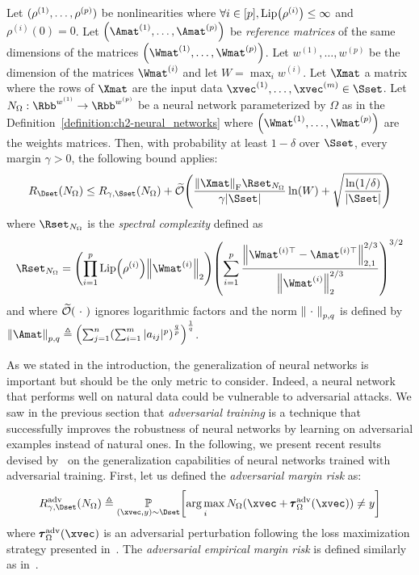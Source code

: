 \begin{theorem}
  Let $(\rho^{(1)}, \dots, \rho^{(p)})$ be nonlinearities where $\forall i \in [\depth], \lip{\rho^{(i)}} \leq \infty$ and $\rho^{(i)}(0) = 0$.
  Let $\left( \Amat^{(1)}, \dots, \Amat^{(\depth)} \right)$ be \emph{reference matrices} of the same dimensions of the matrices $\left( \Wmat^{(1)}, \dots, \Wmat^{(\depth)} \right)$.
  Let $w^{(1)}, \dots, w^{(p)}$ be the dimension of the matrices $\Wmat^{(i)}$ and let $W = \max_i w^{(i)}$.
  Let $\Xmat$ a matrix where the rows of $\Xmat$ are the input data $\xvec^{(1)}, \dots, \xvec^{(m)} \in \Sset$.
  Let $N_\Omega: \Rbb^{w^{(1)}} \rightarrow \Rbb^{w^{(\depth)}}$ be a neural network parameterized by $\Omega$ as in the Definition~\ref{definition:ch2-neural_networks} where $\left( \Wmat^{(1)}, \dots, \Wmat^{(\depth)} \right)$ are the weights matrices.
  Then, with probability at least $1 - \delta$ over $\Sset$, every margin $\gamma > 0$, the following bound applies:
  \begin{equation}
    R_\Dset(N_\Omega) \leq R_{\gamma,\Sset} (N_\Omega) + \widetilde{\bigO}\left( \frac{\norm{\Xmat}_\fro \Rset_{N_\Omega}}{\gamma |\Sset|} \ln(W) + \sqrt{\frac{\ln(1/\delta)}{|\Sset|}} \right)
  \end{equation}
  where $\Rset_{N_\Omega}$ is the \emph{spectral complexity} defined as 
  \begin{equation}
    \Rset_{N_\Omega} = \left(\prod_{i = 1}^{\depth} \lip{\rho^{(i)}} \norm{\Wmat^{(i)}}_2 \right) \left( \sum_{i=1}^{\depth} \frac{\norm{\Wmat^{(i)\top} - \Amat^{(i)\top}}_{2,1}^{2/3}}{\norm{\Wmat^{(i)}}_2^{2/3}} \right)^{3/2}
  \end{equation}
  and where $\widetilde{\mathcal{O}}(\ \cdot\ )$ ignores logarithmic factors and the norm $\norm{\ \cdot\ }_{p,q}$ is defined by $\norm{\Amat}_{p,q} \triangleq \left( \sum _{j=1}^{n} \left(\sum _{i=1}^{m} |a_{ij}|^{p} \right)^{\frac {q}{p}}\right)^{\frac {1}{q}}$.
\end{theorem}

As we stated in the introduction, the generalization of neural networks is important but should be the only metric to consider.
Indeed, a neural network that performs well on natural data could be vulnerable to adversarial attacks. 
We saw in the previous section that \emph{adversarial training} is a technique that successfully improves the robustness of neural networks by learning on adversarial examples instead of natural ones.
In the following, we present recent results devised by~\citet{farnia2018generalizable} on the generalization capabilities of neural networks trained with adversarial training.
First, let us defined the \emph{adversarial margin risk} as:
\begin{equation}
  R_{\gamma, \Dset}^{\text{adv}}(N_\Omega) \triangleq \Pbb_{(\xvec, y) \sim \Dset} \left[\argmax_i N_\Omega(\xvec + \adv^{\text{adv}}_\Omega(\xvec) ) \neq y \right] 
\end{equation}
where $\adv^{\text{adv}}_\Omega(\xvec)$ is an adversarial perturbation following the loss maximization strategy presented in~.
The \emph{adversarial empirical margin risk} is defined similarly as in~.

